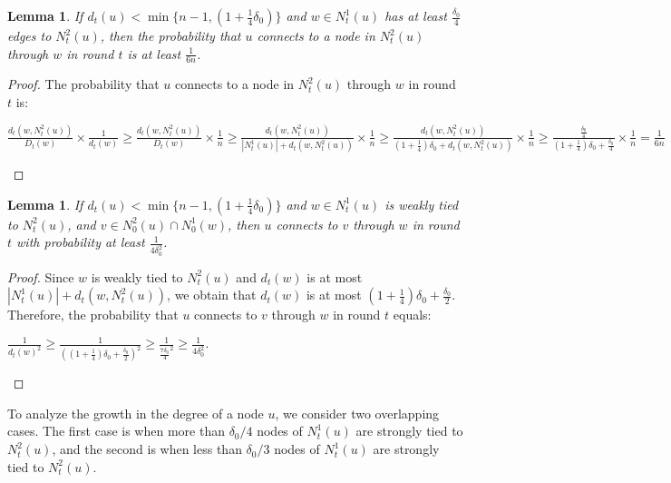 \documentclass[
10pt, %
a4paper, %
oneside, %
headinclude,footinclude, %
BCOR5mm, %
]{scrartcl}
\newtheorem{lemma}[theorem]{\textbf{Lemma}}
\begin{document}
\begin{lemma}\label{lem:4}
	If $d_t(u) < \min \{n-1, (1+\frac{1}{4} \delta_0)\} $ and $w \in N_t^1(u)$ has at least $\frac{\delta_0}{4}$ edges to $N_t^2(u)$, then the probability that $u$ connects to a node in $N_t^2(u)$ through $w$ in round $t$ is at least $\frac{1}{6n}$.
\end{lemma}
\begin{proof}
	The probability that $u$ connects to a node in $N_t^2(u)$ through $w$ in round $t$ is: \\
	\begin{center}
	\begin{math}
		\frac{d_t(w, N_t^2(u))}{D_t(w)} \times \frac{1}{d_t(w)} \geq
		\frac{d_t(w, N_t^2(u))}{D_t(w)} \times \frac{1}{n} \geq
		\frac{d_t(w, N_t^2(u))}{|N_t^1(u)|+ d_t(w, N_t^2(u))} \times \frac{1}{n} \geq
		\frac{d_t(w, N_t^2(u))}{(1 + \frac{1}{4})\delta_0 + d_t(w, N_t^2(u))} \times \frac{1}{n} \geq
		\frac{ \frac{\delta_0}{4} }{(1 + \frac{1}{4})\delta_0 + \frac{\delta_0}{4}} \times \frac{1}{n} =
			\frac{1}{6n}
	\end{math}
	\end{center}
\end{proof}

\begin{lemma}\label{lem:5}
	If $d_t(u) < \min \{n-1, (1+\frac{1}{4} \delta_0)\} $ and $w \in N_t^1(u)$ is weakly tied to $N_t^2(u)$, and $v \in N_0^2(u) \cap N_0^1(w)$, then $u$ connects to $v$ through $w$ in round $t$ with probability at least $\frac{1}{4\delta_0^2}$.
\end{lemma}
\begin{proof}
	Since $w$ is weakly tied to $N_t^2(u)$ and $d_t(w)$ is at most $|N_t^1(u)|+ d_t(w, N_t^2(u))$, we obtain that $d_t(w)$ is at most $(1 + \frac{1}{4})\delta_0 + \frac{\delta_0}{2}$. Therefore, the probability that $u$ connects to $v$ through $w$ in round $t$ equals:
	\begin{center}
		\begin{math}
			\frac{1}{d_t(w)^2} \geq
			\frac{1}{((1 + \frac{1}{4})\delta_0 + \frac{\delta_0}{2})^2} \geq
			\frac{1}{\frac{7\delta_0}{4}^2} \geq
			\frac{1}{4\delta_0^2}.
		\end{math}
	\end{center}
\end{proof}
To analyze the growth in the degree of a node $u$, we consider two overlapping cases. The first case is when more than $\delta_0/4$ nodes of $N_t^1(u)$ are strongly tied to $N_t^2(u)$, and the second is when less than $\delta_0/3$ nodes of $N_t^1(u)$ are strongly tied to $N_t^2(u)$. 
\end{document}
